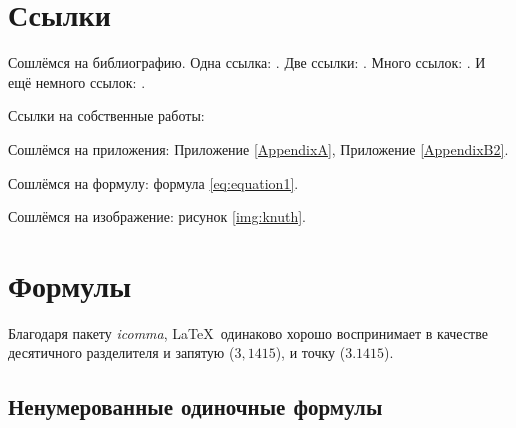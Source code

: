 \section{Ссылки} \label{sect1_2}
Сошлёмся на библиографию.
Одна ссылка: \cite[с.~54]{Sokolov}\cite[с.~36]{Gaidaenko}.
Две ссылки: \cite{Sokolov,Gaidaenko}.
Много ссылок: %
\cite{Lermontov,Management,Borozda,Marketing,Constitution,FamilyCode,Gost.7.0.53,Razumovski,Lagkueva,Pokrovski,Sirotko,Lukina,Methodology,Encyclopedia,Nasirova,Berestova,Kriger}.
И ещё немного ссылок:
\cite{Article,Book,Booklet,Conference,Inbook,Incollection,Manual,Mastersthesis,Misc,Phdthesis,Proceedings,Techreport,Unpublished}.
\cite{medvedev2006jelektronnye, CEAT:CEAT581, doi:10.1080/01932691.2010.513279,Gosele1999161,Li2007StressAnalysis, Shoji199895,test:eisner-sample,AB_patent_Pomerantz_1968,iofis_patent1960}



Ссылки на собственные работы:~\cite{vakbib1, confbib1}

Сошлёмся на приложения: Приложение \ref{AppendixA}, Приложение \ref{AppendixB2}.

Сошлёмся на формулу: формула \eqref{eq:equation1}.

Сошлёмся на изображение: рисунок \ref{img:knuth}.


\section{Формулы} \label{sect1_3}

Благодаря пакету \textit{icomma}, \LaTeX~одинаково хорошо воспринимает в качестве десятичного разделителя и запятую ($3,1415$), и точку ($3.1415$).

\subsection{Ненумерованные одиночные формулы} \label{subsect1_3_1}

